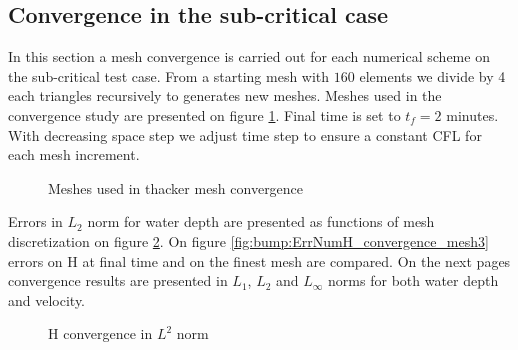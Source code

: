 \subsection{Convergence in the sub-critical case}

In this section a mesh convergence is carried out for each numerical scheme on the sub-critical test case.
From a starting mesh with $160$ elements we divide by 4 each triangles recursively to generates new meshes.
Meshes used in the convergence study are presented on figure \ref{t2d:cone:meshes}.
Final time is set to $t_f=2$ minutes.
With decreasing space step we adjust time step to ensure a constant CFL for each mesh increment.

\begin{figure}[H]
\begin{minipage}[t]{\textwidth}
 \centering
\end{minipage}
\begin{minipage}[t]{\textwidth}
 \centering
\end{minipage}
\begin{minipage}[t]{\textwidth}
 \centering
\end{minipage}
\begin{minipage}[t]{\textwidth}
 \centering
\end{minipage}
 \caption{Meshes used in thacker mesh convergence}
 \label{t2d:cone:meshes}
\end{figure}

Errors in $L_2$ norm for water depth
are presented as functions of mesh discretization on figure
\ref{fig:bump:ErrNumH_convergence}. On figure \ref{fig:bump:ErrNumH_convergence_mesh3} errors on H
at final time and on the finest mesh are compared.
On the next pages convergence results are presented in $L_1$, $L_2$ and $L_{\infty}$ norms for both water depth and velocity.

\begin{figure}[H]
\centering
  \caption{H convergence in $L^2$ norm}
\label{fig:bump:ErrNumH_convergence}
\end{figure}

